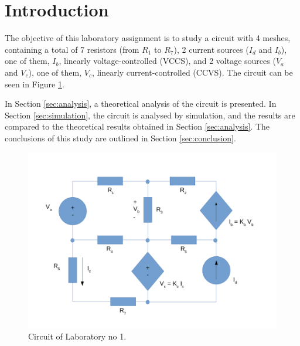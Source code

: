 \section{Introduction}
\label{sec:introduction}


	The objective of this laboratory assignment is to study a circuit with 4 meshes, containing a total of 7 resistors (from $R_1$ to $R_7$), 2 current sources ($I_d$ and $I_b$), one of them, $I_b$, linearly voltage-controlled (VCCS), and 2 voltage sources ($V_a$ and $V_c$), one of them, $V_c$, linearly current-controlled (CCVS). The circuit can be seen in Figure \ref{fig:circuit_intro}.


In Section \ref{sec:analysis}, a theoretical analysis of the circuit is
presented. In Section \ref{sec:simulation}, the circuit is analysed by
simulation, and the results are compared to the theoretical results obtained in
Section \ref{sec:analysis}. The conclusions of this study are outlined in
Section \ref{sec:conclusion}.

\begin{figure}[h] \centering
\includegraphics[width=0.4\linewidth]{circuit_intro.pdf}
\caption{Circuit of Laboratory no 1.}
\label{fig:circuit_intro}
\end{figure}

